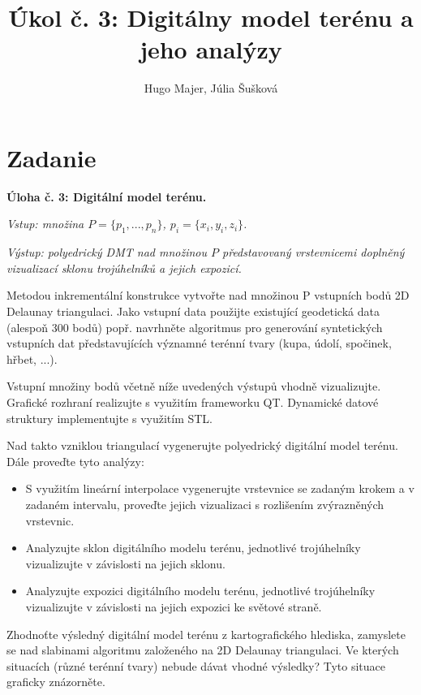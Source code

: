 \documentclass[11pt]{article}
\title{\textbf{Úkol č. 3: Digitálny model terénu a jeho analýzy}}
\author{Hugo Majer, Júlia Šušková}
\begin{document}
\maketitle

\newpage
{}
\section{Zadanie}
\textbf{Úloha č. 3: Digitální model terénu.}

\textit{Vstup: množina $P = \{p_1, ..., p_n\}$, $p_i = \{x_i, y_i, z_i\}$.}

\textit{Výstup: polyedrický DMT nad množinou $P$ představovaný vrstevnicemi doplněný vizualizací sklonu trojúhelníků a jejich expozicí.}

Metodou inkrementální konstrukce vytvořte nad množinou P vstupních bodů 2D Delaunay triangulaci. Jako vstupní data použijte existující geodetická data (alespoň 300 bodů) popř. navrhněte algoritmus pro generování syntetických vstupních dat představujících významné terénní tvary (kupa, údolí, spočinek, hřbet, ...).

Vstupní množiny bodů včetně níže uvedených výstupů vhodně vizualizujte. Grafické rozhraní realizujte s využitím frameworku QT. Dynamické datové struktury implementujte s využitím STL.

Nad takto vzniklou triangulací vygenerujte polyedrický digitální model terénu. Dále proveďte tyto analýzy:
\begin{itemize}
    \item \parindent S využitím lineární interpolace vygenerujte vrstevnice se zadaným krokem a v zadaném intervalu, proveďte jejich vizualizaci s rozlišením zvýrazněných vrstevnic.
    \item \parindent Analyzujte sklon digitálního modelu terénu, jednotlivé trojúhelníky vizualizujte v závislosti na jejich sklonu.
    \item \parindent Analyzujte expozici digitálního modelu terénu, jednotlivé trojúhelníky vizualizujte v závislosti na jejich expozici ke světové straně.
\end{itemize}

Zhodnoťte výsledný digitální model terénu z kartografického hlediska, zamyslete se nad slabinami algoritmu založeného na 2D Delaunay triangulaci. Ve kterých situacích (různé terénní tvary) nebude dávat vhodné výsledky? Tyto situace graficky znázorněte.
\end{document}
